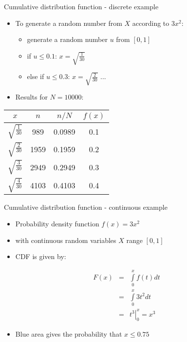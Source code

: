 \begin{slide}[toc=]{Cumulative distribution function - discrete example}
\null\vfill
  
 \begin{itemize}
  \item To generate a random number from $X$ according to $3x^2$:
  \begin{itemize}
    \item generate a random number $u$ from $[0, 1]$
    \item if $u \leq 0.1$: $x = \sqrt{\frac{1}{30}}$
    \item else if $u \leq 0.3$: $x = \sqrt{\frac{2}{30}}$ ...
  \end{itemize}
  \item Results for $N = 10000$:
 \end{itemize}

 \begin{center}
 \begin{tabular}{c|c|c|c}
$x$ & $n$ & $n/N$ & $f(x)$ \\ \hline 
$\sqrt{\frac{1}{30}}$ &  989  & 0.0989 & 0.1 \\
$\sqrt{\frac{2}{30}}$ & 1959 & 0.1959 & 0.2 \\
$\sqrt{\frac{3}{30}}$ & 2949 & 0.2949 & 0.3 \\
$\sqrt{\frac{4}{30}}$ & 4103 & 0.4103 & 0.4 \\
 \end{tabular}
 \end{center}
 
\vfill\null
\end{slide}

\begin{slide}[toc=CDF continuous]{Cumulative distribution function - continuous example}
\null\vfill

  \begin{itemize}
    
    \item Probability density function $f(x) = 3x^2$
    \item[] with continuous random variables $X$ range $[0, 1]$
    \item CDF is given by:
    
  \end{itemize}
  
  \twocolumn
  {
    \begin{eqnarray*}
      F (x) & = & \int\limits_0^x f(t) dt \\
            & = & \int\limits_0^x 3t^2 dt \\
            & = & \left.t^3\right|_0^x = x^3
    \end{eqnarray*}
  }
  {
    
  }
  
  \begin{itemize}
  
    \item Blue area gives the probability that $x \leq 0.75$
    
  \end{itemize}

\vfill\null
\end{slide}

